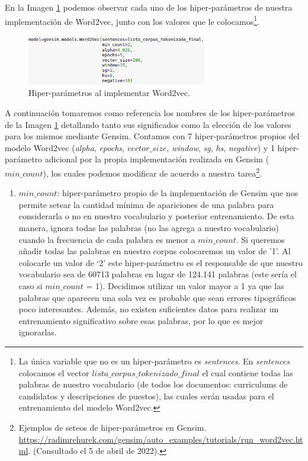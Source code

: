 \documentclass[12pt,a4paper]{article}
\begin{document}
\begin{sloppypar}
En la Imagen \ref{fig:4_Implementacion_Word2vec} podemos observar cada uno de los hiper-parámetros de nuestra implementación de Word2vec, junto con los valores que le colocamos\footnote{La única variable que no es un hiper-parámetro es \textit{sentences}. En \textit{sentences} colocamos el vector \textit{$lista\_corpus\_tokenizado\_final$} el cual contiene todas las palabras de nuestro vocabulario (de todos los documentos: curriculums de candidatos y descripciones de puestos), las cuales serán usadas para el entrenamiento del modelo Word2vec.}.

\begin{figure}[H] 
 \centering
 \includegraphics[width=0.7\textwidth]{images/implementacion_5/4_Implementacion_Word2vec.png}
 \caption{Hiper-parámetros al implementar Word2vec.} 
 \label{fig:4_Implementacion_Word2vec}
\end{figure}

A continuación tomaremos como referencia los nombres de los hiper-parámetros de la Imagen \ref{fig:4_Implementacion_Word2vec} detallando tanto sus significados como la elección de los valores para los mismos mediante Gensim. Contamos con 7 hiper-parámetros propios del modelo Word2vec\cite{Implem_3} (\textit{alpha}, \textit{epochs}, \textit{$vector\_size$}, \textit{window}, \textit{sg}, \textit{hs}, \textit{negative}) y 1 hiper-parámetro adicional por la propia implementación realizada en Gensim (\textit{$min\_count$}), los cuales podemos modificar de acuerdo a nuestra tarea\footnote{Ejemplos de seteos de hiper-parámetros en Gensim. \url{https://radimrehurek.com/gensim/auto_examples/tutorials/run_word2vec.html}. (Consultado el 5 de abril de 2022).}.

\begin{enumerate}

\item \textit{$min\_count$}: hiper-parámetro propio de la implementación de Gensim que nos permite setear la cantidad mínima de apariciones de una palabra para considerarla o no en nuestro vocabulario y posterior entrenamiento. De esta manera, ignora todas las palabras (no las agrega a nuestro vocabulario) cuando la frecuencia de cada palabra es menor a \textit{$min\_count$}. Si queremos añadir todas las palabras en nuestro corpus colocaremos un valor de '1'. Al colocarle un valor de ‘2’ este hiper-parámetro es el responsable de que nuestro vocabulario sea de 60713 palabras en lugar de 124.141 palabras (este sería el caso si \textit{$min\_count$} = 1). Decidimos utilizar un valor mayor a 1 ya que las palabras que aparecen una sola vez es probable que sean errores tipográficos poco interesantes. Además, no existen suficientes datos para realizar un entrenamiento significativo sobre esas palabras, por lo que es mejor ignorarlas.


\end{enumerate}
\end{sloppypar}
\end{document}
